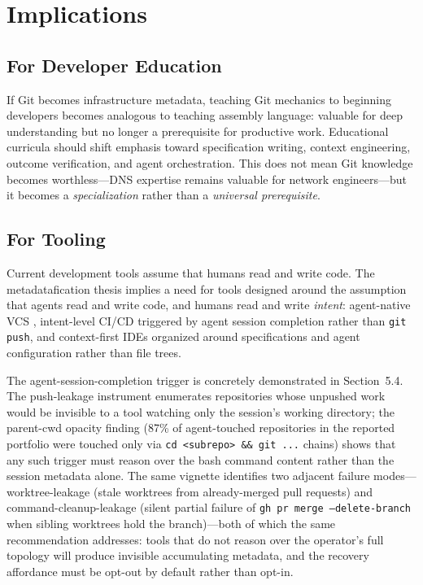 \documentclass[sigconf, nonacm, anonymous=false]{acmart}
\begin{document}
\section{Implications}

\subsection{For Developer Education}

If Git becomes infrastructure metadata, teaching Git mechanics to beginning developers becomes analogous to teaching assembly language: valuable for deep understanding but no longer a prerequisite for productive work. Educational curricula should shift emphasis toward specification writing, context engineering, outcome verification, and agent orchestration. This does not mean Git knowledge becomes worthless---DNS expertise remains valuable for network engineers---but it becomes a \textit{specialization} rather than a \textit{universal prerequisite}.

\subsection{For Tooling}

Current development tools assume that humans read and write code. The metadatafication thesis implies a need for tools designed around the assumption that agents read and write code, and humans read and write \textit{intent}: agent-native VCS \citep{atomic2026, cohen2026manyana}, intent-level CI/CD triggered by agent session completion rather than \texttt{git push}, and context-first IDEs organized around specifications and agent configuration rather than file trees.

The agent-session-completion trigger is concretely demonstrated in Section~5.4. The push-leakage instrument enumerates repositories whose unpushed work would be invisible to a tool watching only the session's working directory; the parent-cwd opacity finding (87\% of agent-touched repositories in the reported portfolio were touched only via \texttt{cd \textless subrepo\textgreater\ \&\& git ...} chains) shows that any such trigger must reason over the bash command content rather than the session metadata alone. The same vignette identifies two adjacent failure modes---worktree-leakage (stale worktrees from already-merged pull requests) and command-cleanup-leakage (silent partial failure of \texttt{gh pr merge --delete-branch} when sibling worktrees hold the branch)---both of which the same recommendation addresses: tools that do not reason over the operator's full topology will produce invisible accumulating metadata, and the recovery affordance must be opt-out by default rather than opt-in.
\end{document}
